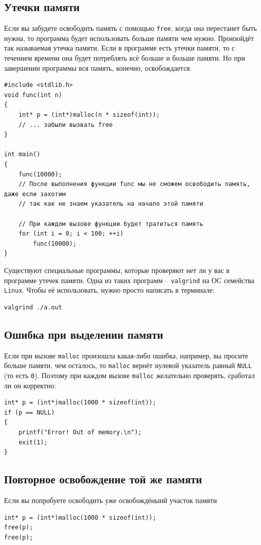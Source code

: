 \documentclass{article}
\begin{document}
\subsection*{Утечки памяти}
Если вы забудете освободить память с помощью \texttt{free}, когда она перестанет быть нужна, то программа будет использовать больше памяти чем нужно. Произойдёт так называемая утечка памяти. Если в программе есть утечки памяти, то с течением времени она будет потреблять всё больше и больше памяти. Но при завершении программы вся память, конечно, освобождается.
\begin{lstlisting}
#include <stdlib.h>
void func(int n) 
{
    int* p = (int*)malloc(n * sizeof(int));
    // ... забыли вызвать free
}

int main() 
{
    func(10000);
    // После выполнения функции func мы не сможем освободить память, даже если захотим
    // так как не знаем указатель на начало этой памяти
    
    // При каждом вызове функции будет тратиться память
    for (int i = 0; i < 100; ++i)
        func(10000);
}
\end{lstlisting}
Существуют специальные программы, которые проверяют нет ли у вас в программе утечек памяти. Одна из таких программ -- \texttt{valgrind} на ОС семейства \texttt{Linux}. Чтобы её использовать, нужно просто написать в терминале:
\begin{verbatim}
valgrind ./a.out
\end{verbatim}

\subsection*{Ошибка при выделении памяти}
Если при вызове \texttt{malloc} произошла какая-либо ошибка, например, вы просите больше памяти, чем осталось, то \texttt{malloc} вернёт нулевой указатель равный \texttt{NULL} (то есть \texttt{0}). Поэтому при каждом вызове \texttt{malloc} желательно проверять, сработал ли он корректно:
\begin{lstlisting}
int* p = (int*)malloc(1000 * sizeof(int));
if (p == NULL) 
{
    printf("Error! Out of memory.\n");
    exit(1);
}
\end{lstlisting}

\subsection*{Повторное освобождение той же памяти}
Если вы попробуете освободить уже освобождёнынй участок памяти
\begin{lstlisting}
int* p = (int*)malloc(1000 * sizeof(int));
free(p);
free(p);
\end{lstlisting}
\end{document}

